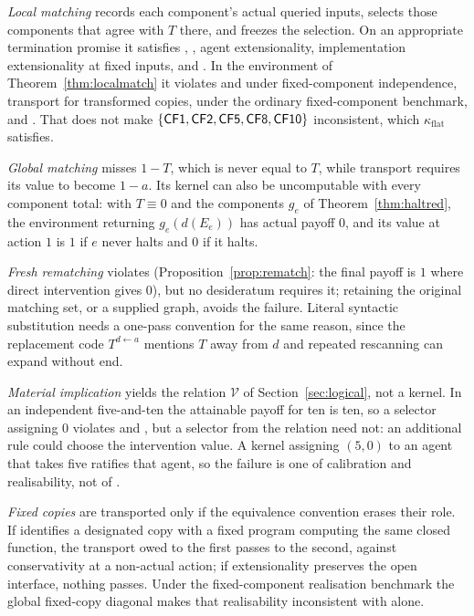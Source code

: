 \emph{Local matching} records each component's actual queried inputs, selects those components that
agree with $T$ there, and freezes the selection. On an appropriate termination promise it satisfies
, , agent extensionality, implementation extensionality at fixed inputs, and
. In the environment of Theorem~\ref{thm:localmatch} it violates  and  under
fixed-component independence, transport for transformed copies,  under the ordinary
fixed-component benchmark, and . That does not make $\{\textup{\textsf{CF1}},\textup{\textsf{CF2}},\textup{\textsf{CF5}},\textup{\textsf{CF8}},\textup{\textsf{CF10}}\}$
inconsistent, which $\kappa_{\mathrm{flat}}$ satisfies.

\emph{Global matching} misses $1-T$, which is never equal to $T$, while transport requires its value
to become $1-a$. Its kernel can also be uncomputable with every component total: with $T\equiv0$ and
the components $g_e$ of Theorem~\ref{thm:haltred}, the environment returning $g_e(d(E_e))$ has actual
payoff $0$, and its value at action $1$ is $1$ if $e$ never halts and $0$ if it halts.

\emph{Fresh rematching} violates  (Proposition~\ref{prop:rematch}: the final payoff is $1$ where
direct intervention gives $0$), but no desideratum requires it; retaining the original matching set, or
a supplied graph, avoids the failure. Literal syntactic substitution needs a one-pass convention for
the same reason, since the replacement code $T^{d\leftarrow a}$ mentions $T$ away from $d$ and repeated
rescanning can expand without end.

\emph{Material implication} yields the relation $\mathcal V$ of Section~\ref{sec:logical}, not a
kernel. In an independent five-and-ten the attainable payoff for ten is ten, so a selector assigning
$0$ violates  and , but a selector from the relation need not: an additional rule could
choose the intervention value. A kernel assigning $(5,0)$ to an agent that takes five ratifies that
agent, so the failure is one of calibration and realisability, not of .

\emph{Fixed copies} are transported only if the equivalence convention erases their role. If
 identifies a designated copy with a fixed program computing the same closed function, the
transport owed to the first passes to the second, against conservativity at a non-actual action;
if extensionality preserves the open interface, nothing passes. Under the fixed-component
realisation benchmark the global fixed-copy diagonal makes that realisability inconsistent with
 alone.

